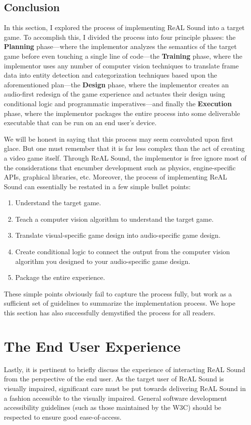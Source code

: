 \documentclass{report}
\newcommand{\rs}{ReAL Sound\xspace}
\newcommand{\plan}{\textbf{Planning}\xspace}
\newcommand{\train}{\textbf{Training}\xspace}
\newcommand{\design}{\textbf{Design}\xspace}
\newcommand{\exec}{\textbf{Execution}\xspace}
\newcommand{\imp}{implementor\xspace}
\begin{document}
\subsection{Conclusion}

In this section, I explored the process of implementing \rs into a target game. To accomplish this, I divided the process into four principle phases: the \plan phase---where the \imp analyzes the semantics of the target game before even touching a single line of code---the \train phase, where the \imp uses any number of computer vision techniques to translate frame data into entity detection and categorization techniques based upon the aforementioned plan---the \design phase, where the \imp creates an audio-first redesign of the game experience and actuates their design using conditional logic and programmatic imperatives---and finally the \exec phase, where the \imp packages the entire process into some deliverable executable that can be run on an end user's device. 

We will be honest in saying that this process may seem convoluted upon first glace. But one must remember that it is far less complex than the act of creating a video game itself. Through \rs, the implementor is free ignore most of the considerations that encumber development such as physics, engine-specific APIs, graphical libraries, etc. Moreover, the process of implementing \rs can essentially be restated in a few simple bullet points:


\begin{enumerate}
    \item Understand the target game.
    \item Teach a computer vision algorithm to understand the target game.
    \item Translate visual-specific game design into audio-specific game design.
    \item Create conditional logic to connect the output from the computer vision algorithm you designed to your audio-specific game design. 
    \item Package the entire experience.
\end{enumerate}

These simple points obviously fail to capture the process fully, but work as a sufficient set of guidelines to summarize the implementation process. We hope this section has also successfully demystified the process for all readers.

\section{The End User Experience}
Lastly, it is pertinent to briefly discuss the experience of interacting \rs from the perspective of the end user. As the target user of \rs is visually impaired, significant care must be put towards delivering \rs in a fashion accessible to the visually impaired. General software development accessibility guidelines (such as those maintained by the W3C\cite{Spellman:24:WAG}) should be respected to ensure good ease-of-access. 
\end{document}
